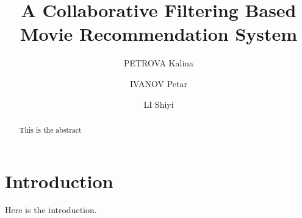 \documentclass[10pt,conference,compsocconf]{IEEEtran}
\begin{document}
\title{A Collaborative Filtering Based Movie Recommendation System}

\author[1]{PETROVA Kalina}
\author[1]{IVANOV Petar}
\author[2]{LI Shiyi}



\maketitle

\begin{abstract}
This is the abstract
\end{abstract}

\section{Introduction}
\label{sec:introduction}

Here is the introduction.













\end{document}
